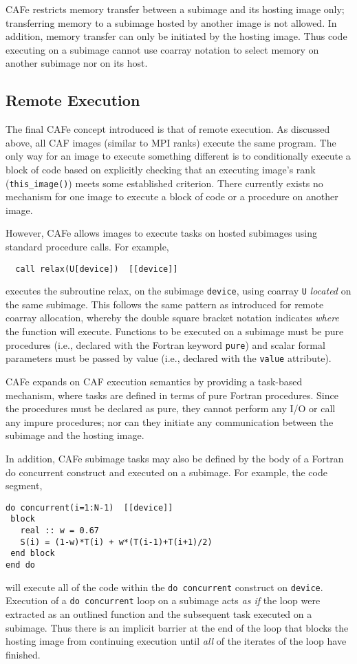 CAFe restricts memory transfer between a subimage and its hosting image only; transferring
memory to a subimage hosted by another image is not allowed.  In addition, memory transfer
can only be initiated by the hosting image.  Thus code executing on a subimage cannot use
coarray notation to select memory on another subimage nor on its host.

\subsection{Remote Execution}

The final CAFe concept introduced is that of remote execution.  As discussed above,
all CAF images (similar to MPI ranks) execute the same program.  The only way for
an image to execute something different is to conditionally execute a block of code based
on explicitly checking that an executing image's rank (\texttt{this\_image()}) meets some
established criterion.  There currently exists no mechanism for one image to execute a
block of code or a procedure on another image.

However, CAFe allows images to execute tasks on hosted subimages using standard procedure
calls.  For example,
\begin{verbatim}
  call relax(U[device])  [[device]]
\end{verbatim}
executes the subroutine relax, on the subimage \texttt{device}, using coarray \texttt{U} \emph{located}
on the same subimage.  This follows the same pattern as introduced for remote coarray allocation,
whereby the double square bracket notation indicates \emph{where} the function will execute.
Functions to be executed on a subimage must be pure procedures (i.e., declared with the Fortran
keyword \texttt{pure}) and scalar formal parameters must be passed by value (i.e., declared with the
\texttt{value} attribute).

CAFe expands on CAF execution semantics by providing a task-based mechanism, where tasks
are defined in terms of pure Fortran procedures.  Since the procedures must be declared
as pure, they cannot perform any I/O or call any impure procedures; nor can they initiate
any communication between the subimage and the hosting image.

In addition, CAFe subimage tasks may also be defined by the body of a Fortran do
concurrent construct and executed on a subimage.  For example, the code segment,
\begin{verbatim}
do concurrent(i=1:N-1)  [[device]]
 block
   real :: w = 0.67
   S(i) = (1-w)*T(i) + w*(T(i-1)+T(i+1)/2)
 end block
end do
\end{verbatim}
will execute all of the code within the \texttt{do concurrent} construct on \texttt{device}.
Execution of a \texttt{do concurrent} loop on a subimage acts \emph{as if} the loop were
extracted as an outlined function and the subsequent task executed on a subimage.  Thus
there is an implicit barrier at the end of the loop that blocks the hosting image
from continuing execution until \emph{all} of the iterates of the loop have finished.

